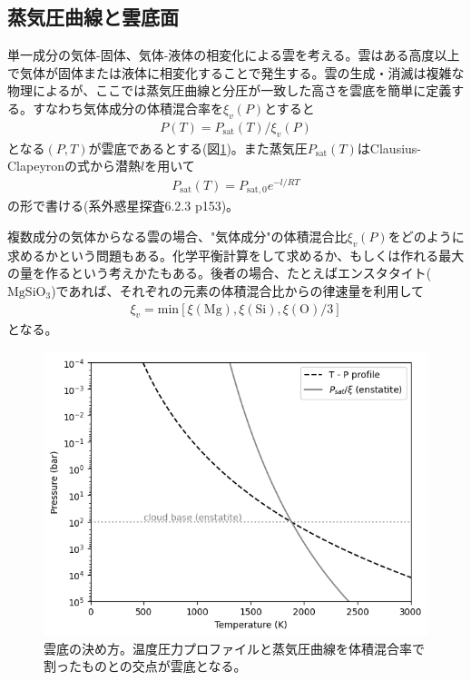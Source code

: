 \subsection*{蒸気圧曲線と雲底面}

単一成分の気体-固体、気体-液体の相変化による雲を考える。雲はある高度以上で気体が固体または液体に相変化することで発生する。雲の生成・消滅は複雑な物理によるが、ここでは蒸気圧曲線と分圧が一致した高さを雲底を簡単に定義する。すなわち気体成分の体積混合率を$\xi_v(P)$とすると
\begin{align}
P(T) = P_\mathrm{sat}(T)/\xi_v(P)
\end{align}
となる$(P,T)$が雲底であるとする(図\ref{fig:pbase})。また蒸気圧$P_\mathrm{sat}(T)$はClausius-Clapeyronの式から潜熱$l$を用いて
\begin{align}
P_\mathrm{sat}(T) = P_\mathrm{sat,0} e^{-l/RT}
\end{align}
の形で書ける(系外惑星探査6.2.3 p153)。


複数成分の気体からなる雲の場合、"気体成分"の体積混合比$\xi_v(P)$をどのように求めるかという問題もある。化学平衡計算をして求めるか、もしくは作れる最大の量を作るという考えかたもある。後者の場合、たとえばエンスタタイト($\mathrm{Mg Si O_3}$)であれば、それぞれの元素の体積混合比からの律速量を利用して
\begin{align}
\xi_v = \mathrm{min} [ \xi(\mathrm{Mg}),\xi(\mathrm{Si}),\xi(\mathrm{O})/3 ]
\end{align}
となる。

\begin{figure}[htb]
\begin{center}
\includegraphics[width=\linewidth]{fig/clouds/pbase.png}
\caption{雲底の決め方。温度圧力プロファイルと蒸気圧曲線を体積混合率で割ったものとの交点が雲底となる。\label{fig:pbase}}
\end{center}
\end{figure}

